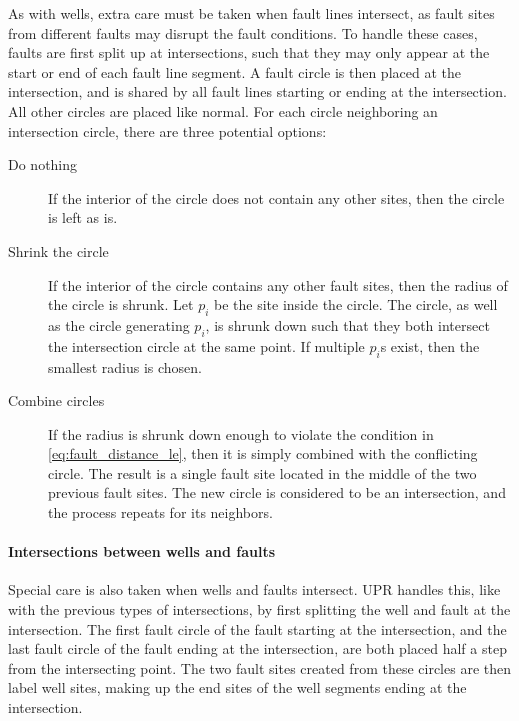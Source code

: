 As with wells, extra care must be taken when fault lines intersect, as fault sites from different faults may disrupt the fault conditions. To handle these cases, faults are first split up at intersections, such that they may only appear at the start or end of each fault line segment. A fault circle is then placed at the intersection, and is shared by all fault lines starting or ending at the intersection. All other circles are placed like normal. For each circle neighboring an intersection circle, there are three potential options:
\begin{description}
    \item[Do nothing] If the interior of the circle does not contain any other sites, then the circle is left as is.
    \item[Shrink the circle] If the interior of the circle contains any other fault sites, then the radius of the circle is shrunk. Let $p_i$ be the site inside the circle. The circle, as well as the circle generating $p_i$, is shrunk down such that they both intersect the intersection circle at the same point. If multiple $p_i$s exist, then the smallest radius is chosen.
    \item[Combine circles] If the radius is shrunk down enough to violate the condition in \autoref{eq:fault_distance_le}, then it is simply combined with the conflicting circle. The result is a single fault site located in the middle of the two previous fault sites. The new circle is considered to be an intersection, and the process repeats for its neighbors.
\end{description}

\paragraph{Intersections between wells and faults}
\label{UPR:intersections}
Special care is also taken when wells and faults intersect. UPR handles this, like with the previous types of intersections, by first splitting the well and fault at the intersection. The first fault circle of the fault starting at the intersection, and the last fault circle of the fault ending at the intersection, are both placed half a step from the intersecting point. The two fault sites created from these circles are then label well sites, making up the end sites of the well segments ending at the intersection.

